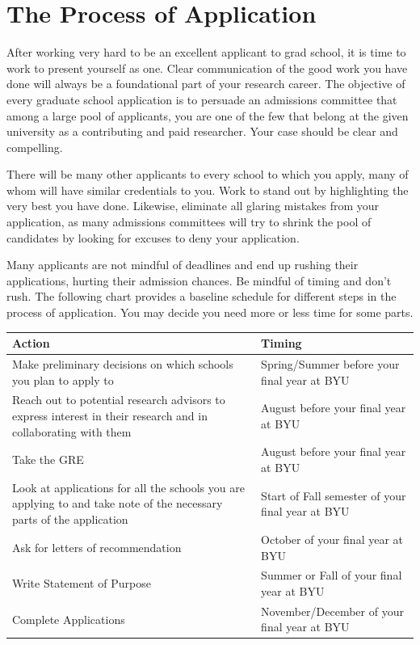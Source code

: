 \documentclass[11pt]{article}
\begin{document}
\newpage

\section{The Process of Application}

After working very hard to be an excellent applicant to grad school, it is time to work to present yourself as one. Clear communication of the good work you have done will always be a foundational part of your research career. The objective of every graduate school application is to persuade an admissions committee that among a large pool of applicants, you are one of the few that belong at the given university as a contributing and paid researcher. Your case should be clear and compelling.

There will be many other applicants to every school to which you apply, many of whom will have similar credentials to you. Work to stand out by highlighting the very best you have done. Likewise, eliminate all glaring mistakes from your application, as many admissions committees will try to shrink the pool of candidates by looking for excuses to deny your application.

Many applicants are not mindful of deadlines and end up rushing their applications, hurting their admission chances. Be mindful of timing and don't rush. The following chart provides a baseline schedule for different steps in the process of application. You may decide you need more or less time for some parts.

\begin{center}
\begin{tabular}{|p{}|p{}|}
\hline
\textbf{Action} & \textbf{Timing} \\
\hline
Make preliminary decisions on which schools you plan to apply to & Spring/Summer before your final year at BYU \\
\hline
Reach out to potential research advisors to express interest in their research and in collaborating with them & August before your final year at BYU \\
\hline
Take the GRE & August before your final year at BYU \\
\hline
Look at applications for all the schools you are applying to and take note of the necessary parts of the application & Start of Fall semester of your final year at BYU \\
\hline
Ask for letters of recommendation & October of your final year at BYU \\
\hline
Write Statement of Purpose & Summer or Fall of your final year at BYU \\
\hline
Complete Applications & November/December of your final year at BYU \\
\hline
\end{tabular}
\end{center}
\end{document}
